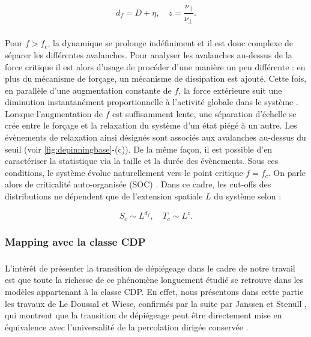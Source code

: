 \begin{equation}
	d_f = D + \eta, \quad z = \frac{\nu_\parallel}{\nu_\perp}.
\end{equation}

\subparagraph{}Pour $f>f_c$, la dynamique se prolonge indéfiniment et il est donc complexe de séparer les différentes avalanches. Pour analyser les avalanches au-dessus de la force critique il est alors d'usage de procéder d'une manière un peu différente : en plus du mécanisme de forçage, un mécanisme de dissipation est ajouté. Cette fois, en parallèle d'une augmentation constante de $f$, la force extérieure suit une diminution instantanément proportionnelle à l'activité globale dans le système \cite{le_priol_long_range_2020, wiese_theory_2022}. Lorsque l'augmentation de $f$ est suffisamment lente, une séparation d'échelle se crée entre le forçage et la relaxation du système d'un état piégé à un autre. Les évènements de relaxation ainsi désignés sont associés aux avalanches au-dessus du seuil (voir \autoref{fig:depinningbase}-(c)). De la même façon, il est possible d'en caractériser la statistique via la taille et la durée des évènements. Sous ces conditions, le système évolue naturellement vers le point critique $f=f_c$. On parle alors de criticalité auto-organisée (SOC) \cite{bak_self_organized_1988, turcotte_self_organized_1999, lubeck_universal_2004}. Dans ce cadre, les cut-offs des distributions ne dépendent que de l'extension spatiale $L$ du système selon :

\begin{equation}
	S_c \sim L^{d_f}, \quad T_c \sim L^{z}.
\end{equation}

\subsubsection{Mapping avec la classe CDP}

\label{sec:mapping_dep_cdp}

\subparagraph{}L'intérêt de présenter la transition de dépiégeage dans le cadre de notre travail est que toute la richesse de ce phénomène longuement étudié se retrouve dans les modèles appartenant à la classe CDP. En effet, nous présentons dans cette partie les travaux de Le Doussal et Wiese, confirmés par la suite par Janssen et Stenull \cite{janssen_directed_2016}, qui montrent que la transition de dépiégeage peut être directement mise en équivalence avec l'universalité de la percolation dirigée conservée \cite{le_doussal_exact_2015, wiese_hyperuniformity_2024}.

